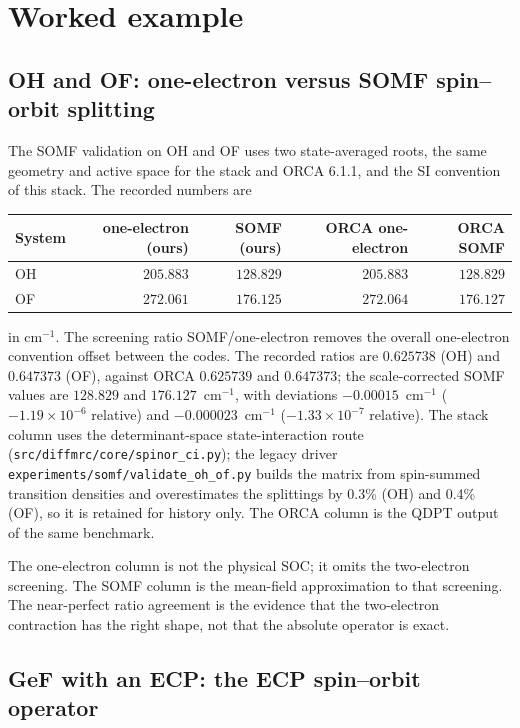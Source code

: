 \section{Worked example}
\label{sec:x2c-example}

\subsection{OH and OF: one-electron versus SOMF spin--orbit splitting}

The SOMF validation on OH and OF uses two state-averaged roots, the
same geometry and active space for the stack and ORCA 6.1.1, and the
SI convention of this stack.  The recorded numbers are
\begin{center}
\small
\begin{tabular}{lrrrr}
\toprule
System & one-electron (ours) & SOMF (ours) & ORCA one-electron & ORCA SOMF \\
\midrule
OH & $205.883$ & $128.829$ & $205.883$ & $128.829$ \\
OF & $272.061$ & $176.125$ & $272.064$ & $176.127$ \\
\bottomrule
\end{tabular}
\end{center}
in cm$^{-1}$.  The screening ratio SOMF/one-electron removes the
overall one-electron convention offset between the codes.  The
recorded ratios are $0.625738$ (OH) and $0.647373$ (OF), against ORCA
$0.625739$ and $0.647373$; the scale-corrected SOMF values are
$128.829$ and $176.127$~cm$^{-1}$, with deviations
$-0.00015$~cm$^{-1}$ ($-1.19\times10^{-6}$ relative) and
$-0.000023$~cm$^{-1}$ ($-1.33\times10^{-7}$ relative).  The stack column
uses the determinant-space state-interaction route
(\texttt{src/diffmrc/core/spinor\_ci.py}); the legacy driver
\texttt{experiments/somf/validate\_oh\_of.py} builds the matrix from
spin-summed transition densities and overestimates the splittings by
0.3\% (OH) and 0.4\% (OF), so it is retained for history only.  The ORCA column is
the QDPT output of the same benchmark.

The one-electron column is not the physical SOC; it omits the
two-electron screening.  The SOMF column is the mean-field
approximation to that screening.  The near-perfect ratio agreement is
the evidence that the two-electron contraction has the right shape,
not that the absolute operator is exact.

\subsection{GeF with an ECP: the ECP spin--orbit operator}


